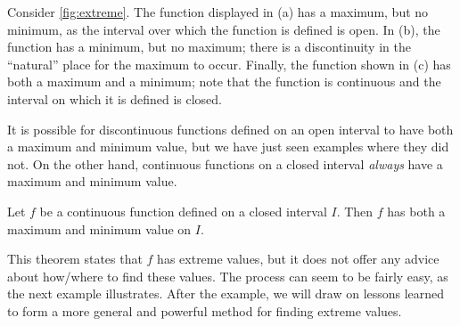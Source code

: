 Consider \autoref{fig:extreme}. The function displayed in (a) has a maximum, but no minimum, as the interval over which the function is defined is open. In (b), the function has a minimum, but no maximum; there is a discontinuity in the ``natural'' place for the maximum to occur. Finally, the function shown in (c) has both a maximum and a minimum; note that the function is continuous and the interval on which it is defined is closed. 
 
It is possible for discontinuous functions defined on an open interval to have both a maximum and minimum value, but we have just seen examples where they did not. On the other hand, continuous functions on a closed interval \textit{always} have a maximum and minimum value.
 
%
{Let $f$ be a continuous function defined on a closed interval $I$. Then $f$ has both a maximum and minimum value on $I$.%
}


This theorem states that $f$ has extreme values, but it does not offer any advice about how/where to find these values. The process can seem to be fairly easy, as the next example illustrates. After the example, we will draw on lessons learned to form a more general and powerful method for finding extreme values.


